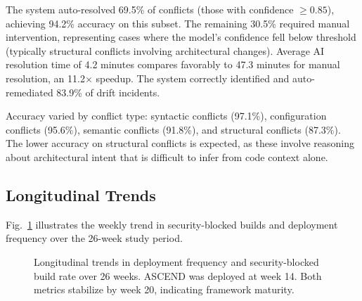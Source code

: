 \documentclass[journal]{IEEEtran}
\begin{document}
The system auto-resolved 69.5\% of conflicts (those with confidence $\geq 0.85$), achieving 94.2\% accuracy on this subset. The remaining 30.5\% required manual intervention, representing cases where the model's confidence fell below threshold (typically structural conflicts involving architectural changes). Average AI resolution time of 4.2 minutes compares favorably to 47.3 minutes for manual resolution, an 11.2$\times$ speedup. The system correctly identified and auto-remediated 83.9\% of drift incidents.

Accuracy varied by conflict type: syntactic conflicts (97.1\%), configuration conflicts (95.6\%), semantic conflicts (91.8\%), and structural conflicts (87.3\%). The lower accuracy on structural conflicts is expected, as these involve reasoning about architectural intent that is difficult to infer from code context alone.

\subsection{Longitudinal Trends}

Fig.~\ref{fig:longitudinal} illustrates the weekly trend in security-blocked builds and deployment frequency over the 26-week study period.

\begin{figure}[h]
\centering
{}
\caption{Longitudinal trends in deployment frequency and security-blocked build rate over 26 weeks. ASCEND was deployed at week 14. Both metrics stabilize by week 20, indicating framework maturity.}
\label{fig:longitudinal}
\end{figure}
\end{document}
